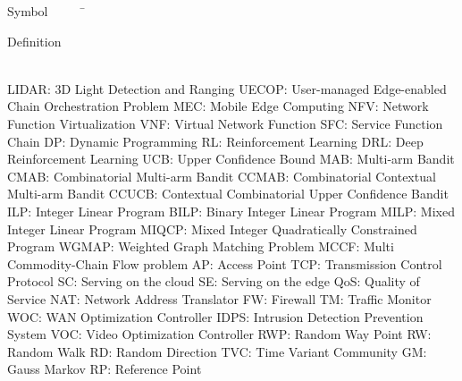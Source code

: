 

\begin{tabbing}
Symbol~~~~~\= \ \ \ \ \ \ \ \ \ \ \ \ \ \ \ \ \ \ \ \ \ \ \ \ \ \ \ \ \ \ \ \ \ \ \ \  \parbox{5in}{Definition}\\
\addsymbol \mbox{LIDAR}: {3D Light Detection and Ranging}
\addsymbol \mbox{UECOP}: {User-managed Edge-enabled Chain Orchestration Problem}
\addsymbol \mbox{MEC}: {Mobile Edge Computing}
\addsymbol \mbox{NFV}: {Network Function Virtualization}
\addsymbol \mbox{VNF}: {Virtual Network Function}
\addsymbol \mbox{SFC}: {Service Function Chain}
\addsymbol \mbox{DP}: {Dynamic Programming}
\addsymbol \mbox{RL}: {Reinforcement Learning}
\addsymbol \mbox{DRL}: {Deep Reinforcement Learning}
\addsymbol \mbox{UCB}: {Upper Confidence Bound}
\addsymbol \mbox{MAB}: {Multi-arm Bandit}
\addsymbol \mbox{CMAB}: {Combinatorial Multi-arm Bandit}
\addsymbol \mbox{CCMAB}: {Combinatorial Contextual Multi-arm Bandit}
\addsymbol \mbox{CCUCB}: {Contextual Combinatorial  Upper Confidence  Bandit}
\addsymbol \mbox{ILP}: {Integer Linear Program}
\addsymbol \mbox{BILP}: {Binary Integer Linear Program}
\addsymbol \mbox{MILP}: {Mixed Integer Linear Program}
\addsymbol \mbox{MIQCP}: {Mixed Integer Quadratically Constrained Program}
\addsymbol \mbox{WGMAP}: {Weighted Graph Matching Problem}
\addsymbol \mbox{MCCF}: {Multi Commodity-Chain Flow problem}
\addsymbol \mbox{AP}: {Access Point}
\addsymbol \mbox{TCP}: {Transmission Control Protocol}
\addsymbol \mbox{SC}: {Serving on the cloud}
\addsymbol \mbox{SE}: {Serving on the edge}
\addsymbol \mbox{QoS}: {Quality of Service}
\addsymbol \mbox{NAT}: {Network Address Translator}
\addsymbol \mbox{FW}: {Firewall}
\addsymbol \mbox{TM}: {Traffic Monitor}
\addsymbol \mbox{WOC}: {WAN Optimization Controller}
\addsymbol \mbox{IDPS}: {Intrusion Detection Prevention System}
\addsymbol \mbox{VOC}: {Video Optimization Controller}
\addsymbol \mbox{RWP}: {Random Way Point}
\addsymbol \mbox{RW}: {Random Walk}
\addsymbol \mbox{RD}: {Random Direction}
\addsymbol \mbox{TVC}: {Time Variant Community}
\addsymbol \mbox{GM}: {Gauss Markov}
\addsymbol \mbox{RP}: {Reference Point}
\end{tabbing}
